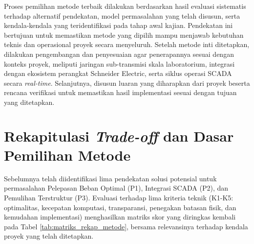 Proses pemilihan metode terbaik dilakukan berdasarkan hasil evaluasi sistematis terhadap alternatif pendekatan, model permasalahan yang telah disusun, serta kendala-kendala yang teridentifikasi pada tahap awal kajian. Pendekatan ini bertujuan untuk memastikan metode yang dipilih mampu menjawab kebutuhan teknis dan operasional proyek secara menyeluruh. Setelah metode inti ditetapkan, dilakukan pengembangan dan penyesuaian agar penerapannya sesuai dengan konteks proyek, meliputi jaringan sub-transmisi skala laboratorium, integrasi dengan ekosistem perangkat Schneider Electric, serta siklus operasi SCADA secara \textit{real-time}. Selanjutnya, disusun luaran yang diharapkan dari proyek beserta rencana verifikasi untuk memastikan hasil implementasi sesuai dengan tujuan yang ditetapkan.

\section{Rekapitulasi \textit{Trade-off} dan Dasar Pemilihan Metode}
\label{sec:Rekapitulasi_Trade_off}

Sebelumnya telah diidentifikasi lima pendekatan solusi potensial untuk permasalahan Pelepasan Beban Optimal (P1), Integrasi SCADA (P2), dan Pemulihan Terstruktur (P3). Evaluasi terhadap lima kriteria teknik (K1-K5: optimalitas, kecepatan komputasi, transparansi, penegakan batasan fisik, dan kemudahan implementasi) menghasilkan matriks skor yang diringkas kembali pada Tabel \ref{tab:matriks_rekap_metode}, bersama relevansinya terhadap kendala proyek yang telah ditetapkan.

